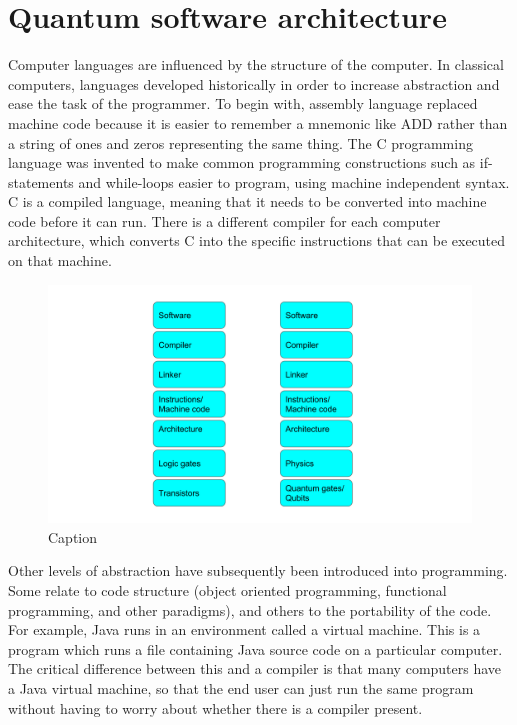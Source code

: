 \section{Quantum software architecture}
Computer languages are influenced by the structure of the computer. In classical computers, languages developed historically in order to increase abstraction and ease the task of the programmer. To begin with, assembly language replaced machine code because it is easier to remember a mnemonic like ADD rather than a string of ones and zeros representing the same thing. The C programming language was invented to make common programming constructions such as if-statements and while-loops easier to program, using machine independent syntax. C is a compiled language, meaning that it needs to be converted into machine code before it can run. There is a different compiler for each computer architecture, which converts C into the specific instructions that can be executed on that machine. 

\begin{figure}[H]
    \centering
    \includegraphics[width=\textwidth]{figures/impl/cpuqpu.png}
    \caption{Caption}
    \label{fig:my_label}
\end{figure}

Other levels of abstraction have subsequently been introduced into programming. Some relate to code structure (object oriented programming, functional programming, and other paradigms), and others to the portability of the code. For example, Java runs in an environment called a virtual machine. This is a program which runs a file containing Java source code on a particular computer. The critical difference between this and a compiler is that many computers have a Java virtual machine, so that the end user can just run the same program without having to worry about whether there is a compiler present. 


